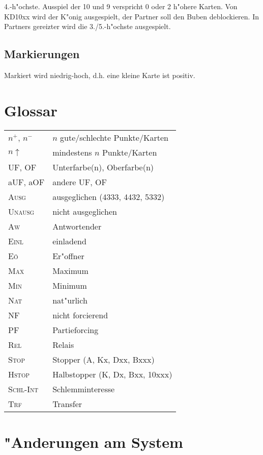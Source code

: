 \documentclass[11pt,german,twocolumn]{scrartcl}
\def\good{$^+$}
\def\bad{$^-$}
\def\pl{$\uparrow$}
\def\ufa{\textsf{UF}}
\def\aufa{\textsf{aUF}}
\def\ofa{\textsf{OF}}
\def\aofa{\textsf{aOF}}
\def\bal{\textsc{Ausg}}
\def\unbal{\textsc{Unausg}}
\def\nat{\textsc{Nat}}
\def\pf{\textsc{PF}}
\def\maxi{\textsc{Max}}
\def\mini{\textsc{Min}}
\def\inv{\textsc{Einl}}
\def\nf{\textsc{NF}}
\def\rel{\textsc{Rel}}
\def\stp{\textsc{Stop}}
\def\hstp{\textsc{Hstop}}
\def\aw{\textsc{Aw}}
\def\eo{\textsc{E\"o}}
\def\xfer{\textsc{Trf}}
\def\slamint{\textsc{Schl-Int}}
\begin{document}
4.-h"ochste. Ausspiel der 10 und 9 verspricht 0 oder 2 h"ohere Karten. Von
KD10xx wird der K"onig ausgespielt, der Partner soll den Buben deblockieren. In
Partners gereizter wird die 3./5.-h"ochste ausgespielt.

\subsection{Markierungen}

Markiert wird niedrig-hoch, d.h. eine kleine Karte ist positiv.

\begin{appendix}

\section{Glossar}

\begin{flushleft}
\begin{tabularx}{\columnwidth}{lX}%
$n$\good, $n$\bad & $n$ gute/schlechte Punkte/Karten \\
$n$\pl & mindestens $n$ Punkte/Karten \\
\ufa, \ofa & Unterfarbe(n), Oberfarbe(n) \\
\aufa, \aofa & andere \ufa, \ofa\\
\bal & ausgeglichen (4333, 4432, 5332)\\
\unbal & nicht ausgeglichen \\
\aw & Antwortender \\
\inv & einladend \\
\eo & Er"offner \\
\maxi & Maximum \\
\mini & Minimum \\
\nat & nat"urlich \\
\nf & nicht forcierend \\
\pf & Partieforcing \\
\rel & Relais \\
\stp & Stopper (A, Kx, Dxx, Bxxx) \\
\hstp & Halbstopper (K, Dx, Bxx, 10xxx) \\
\slamint & Schlemminteresse \\
\xfer & Transfer \\
\end{tabularx}%
\end{flushleft}

\section{"Anderungen am System}


\end{appendix}
\end{document}

